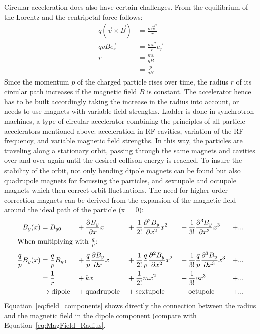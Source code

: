 Circular acceleration does also have certain challenges.
From the equilibrium of the Lorentz and the centripetal force follows:
\begin{align}
q(\vec{v}\times \vec{B}) &= \frac{m\vec{v}^2}{r}\\
qvB\vec{e_r} &= \frac{mv^2}{r}\vec{e_r} \nonumber \\
 r&=\frac{mv}{qB}\\
 &=\frac{p}{qB}\label{eq:MagField_Radius}
\end{align}
Since the momentum $p$ of the charged particle rises over time, the radius $r$ of its circular path increases if the magnetic field $B$ is constant.
The accelerator hence has to be built accordingly taking the increase in the radius into account, or needs to use magnets with variable field strengths.
Ladder is done in synchrotron machines, a type of circular accelerator combining the principles of all particle accelerators mentioned above: acceleration in RF cavities, variation of the RF frequency, and variable magnetic field strengths.
In this way, the particles are traveling along a stationary orbit, passing through the same magnets and cavities over and over again until the desired collison energy is reached.
To insure the stability of the orbit, not only bending dipole magnets can be found but also quadrupole magnets for focussing the particles, and sextupole and octupole magnets which then correct orbit fluctuations.
The need for higher order correction magnets can be derived from the expansion of the magnetic field around the ideal path of the particle (x = 0):
\begin{alignat}{5}
 B_y(x) &= B_{y0} &&+ \frac{\partial B_y}{\partial x}x &&+ \frac{1}{2!}\frac{\partial^2 B_y}{\partial x^2}x^2 &&+ \frac{1}{3!}\frac{\partial^3 B_y}{\partial x^3}x^3 &+ ...\\
 \intertext{When multiplying with $\frac{q}{p}$:}
 \frac{q}{p}B_y(x) &= \frac{q}{p}B_{y0} &&+ \frac{q}{p}\frac{\partial B_y}{\partial x}x &&+  \frac{1}{2!}\frac{q}{p}\frac{\partial^2 B_y}{\partial x^2}x^2 &&+ \frac{1}{3!}\frac{q}{p}\frac{\partial^3 B_y}{\partial x^3}x^3 &+ ...\\
  &= \frac{1}{r} &&+ kx &&+ \frac{1}{2!}mx^2 &&+ \frac{1}{3!}ox^3 &+ ... \label{eq:field_components}\\
  &\rightarrow \textnormal{dipole} &&+ \textnormal{quadrupole} &&+ \textnormal{sextupole} &&+ \textnormal{octupole} &+ ...
\end{alignat}
Equation~\ref{eq:field_components} shows directly the connection between the radius and the magnetic field in the dipole component (compare with Equation~\ref{eq:MagField_Radius}.
